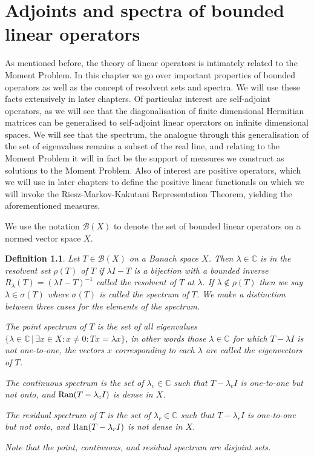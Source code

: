 \documentclass[12pt,oneside]{report}
\newtheorem{defn}[thm]{Definition}
\begin{document}




\chapter{Adjoints and spectra of bounded linear operators}

As mentioned before, the theory of linear operators is intimately related to the Moment Problem. In this chapter we go over important properties of bounded operators as well as the concept of resolvent sets and spectra. We will use these facts extensively in later chapters. Of particular interest are self-adjoint operators, as we will see that the diagonalisation of finite dimensional Hermitian matrices can be generalised to self-adjoint linear operators on infinite dimensional spaces. We will see that the spectrum, the analogue through this generalisation of the set of eigenvalues remains a subset of the real line, and relating to the Moment Problem it will in fact be the support of measures we construct as solutions to the Moment Problem. Also of interest are positive operators, which we will use in later chapters to define the positive linear functionals on which we will invoke the Riesz-Markov-Kakutani Representation Theorem, yielding the aforementioned measures.

We use the notation $\mathscr{B}(X)$ to denote the set of bounded linear operators on a normed vector space $X$.

\begin{defn}
    Let $T \in \mathscr{B}(X)$ on a Banach space $X$. Then $\lambda \in \mathbb{C}$ is in the resolvent set $\rho(T)$ of $T$ if $\lambda I - T$ is a bijection with a bounded inverse $R_{\lambda}(T) = (\lambda I - T)^{-1}$ called the resolvent of $T$ at $\lambda$. If $\lambda \notin \rho(T)$ then we say $\lambda \in \sigma(T)$ where $\sigma(T)$ is called the spectrum of $T$. We make a distinction between three cases for the elements of the spectrum.
    
    The point spectrum of $T$ is the set of all eigenvalues $\{ \lambda \in \mathbb{C} \, | \, \exists x \in X: x \neq 0: Tx = \lambda x \}$, in other words those $\lambda \in \mathbb{C}$ for which $T - \lambda I$ is not one-to-one, the vectors $x$ corresponding to each $\lambda$ are called the eigenvectors of $T$.
    
    The continuous spectrum is the set of $\lambda_{c} \in \mathbb{C}$ such that $T - \lambda_{c} I$ is one-to-one but not onto, and $\mathrm{Ran}(T - \lambda_{c}I)$ is dense in $X$.
    
    The residual spectrum of $T$ is the set of $\lambda_{r} \in \mathbb{C}$ such that $T - \lambda_{r}I$ is one-to-one but not onto, and $\mathrm{Ran}(T - \lambda_{r}I)$ is not dense in $X$.

    Note that the point, continuous, and residual spectrum are disjoint sets.
\end{defn}
\end{document}
